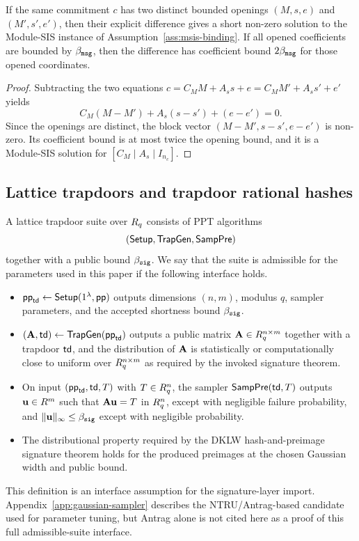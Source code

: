 \begin{lemma}\label{lem:commit-binding}
If the same commitment \(c\) has two distinct bounded openings \((M,s,e)\) and \((M',s',e')\), then their
explicit difference gives a short non-zero solution to the Module-SIS instance of Assumption~\ref{ass:msis-binding}.
If all opened coefficients are bounded by \(\beta_{\mathtt{msg}}\), then the difference has coefficient bound
\(2\beta_{\mathtt{msg}}\) for those opened coordinates.
\end{lemma}

\begin{proof}
Subtracting the two equations \(c=C_MM+A_s s+e=C_MM'+A_s s'+e'\) yields
\[
  C_M(M-M')+A_s(s-s')+(e-e')=0.
\]
Since the openings are distinct, the block vector \((M-M',s-s',e-e')\) is non-zero.  Its coefficient bound is at
most twice the opening bound, and it is a Module-SIS solution for \([C_M\mid A_s\mid I_{n_c}]\).
\end{proof}

\subsection{Lattice trapdoors and trapdoor rational hashes}
\label{subsec:prelim-vsis}

\begin{definition}\label{def:trapdoor-suite}
A lattice trapdoor suite over \(R_q\) consists of PPT algorithms
\[
  (\mathsf{Setup},\mathsf{TrapGen},\mathsf{SampPre})
\]
together with a public bound \(\beta_{\mathtt{sig}}\).  We say that the suite is admissible for the parameters used in this
paper if the following interface holds.
\begin{itemize}[leftmargin=1.25em]
  \item \(\mathsf{pp}_{\mathsf{td}}\gets\mathsf{Setup}(1^\lambda,\mathsf{pp})\) outputs dimensions \((n,m)\), modulus
  \(q\), sampler parameters, and the accepted shortness bound \(\beta_{\mathtt{sig}}\).
  \item \((\mathbf{A},\mathsf{td})\gets\mathsf{TrapGen}(\mathsf{pp}_{\mathsf{td}})\) outputs a public matrix
  \(\mathbf{A}\in R_q^{n\times m}\) together with a trapdoor \(\mathsf{td}\), and the distribution of \(\mathbf{A}\) is
  statistically or computationally close to uniform over \(R_q^{n\times m}\) as required by the invoked
  signature theorem.
  \item On input \((\mathsf{pp}_{\mathsf{td}},\mathsf{td},T)\) with \(T\in R_q^n\), the sampler
  \(\mathsf{SampPre}(\mathsf{td},T)\) outputs \(\mathbf{u}\in R^m\) such that \(\mathbf{A}\mathbf{u}=T\) in \(R_q^n\), except with
  negligible failure probability, and \(\|\mathbf{u}\|_\infty\le \beta_{\mathtt{sig}}\) except with negligible probability.
  \item The distributional property required by the DKLW hash-and-preimage signature theorem holds for the
  produced preimages at the chosen Gaussian width and public bound.
\end{itemize}
This definition is an interface assumption for the signature-layer import.  Appendix~\ref{app:gaussian-sampler}
describes the NTRU/Antrag-based candidate used for parameter tuning, but Antrag alone is not cited here as a proof
of this full admissible-suite interface.
\end{definition}

